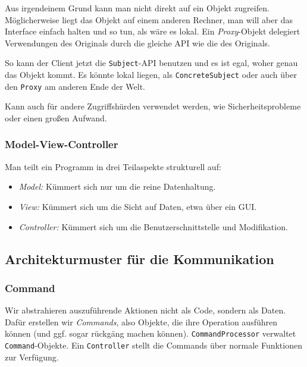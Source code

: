 \documentclass[a4paper,parskip=half*,DIV=7,fontsize=11pt]{scrartcl}
\begin{document}
Aus irgendeinem Grund kann man nicht direkt auf ein Objekt zugreifen. Möglicherweise liegt das Objekt auf einem anderen Rechner, man will aber das Interface einfach halten und so tun, als wäre es lokal. Ein \emph{Proxy}-Objekt delegiert Verwendungen des Originals durch die gleiche API wie die des Originals.

So kann der Client jetzt die \lstinline{Subject}-API benutzen und es ist egal, woher genau das Objekt kommt. Es könnte lokal liegen, als \lstinline{ConcreteSubject} oder auch über den \lstinline{Proxy} am anderen Ende der Welt.

Kann auch für andere Zugriffshürden verwendet werden, wie Sicherheitsprobleme oder einen großen Aufwand.

\subsubsection{Model-View-Controller}

Man teilt ein Programm in drei Teilaspekte strukturell auf: \begin{itemize}
\item \emph{Model:} Kümmert sich nur um die reine Datenhaltung.
\item \emph{View:} Kümmert sich um die Sicht auf Daten, etwa über ein GUI.
\item \emph{Controller:} Kümmert sich um die Benutzerschnittstelle und Modifikation. %
\end{itemize}

\subsection{Architekturmuster für die Kommunikation}

\subsubsection{Command}

Wir abstrahieren auszuführende Aktionen nicht als Code, sondern als Daten. Dafür erstellen wir \emph{Commands}, also Objekte, die ihre Operation ausführen können (und ggf. sogar rückgäng machen können). \lstinline{CommandProcessor} verwaltet \lstinline{Command}-Objekte. Ein \lstinline{Controller} stellt die Commands über normale Funktionen zur Verfügung.

\end{document}
